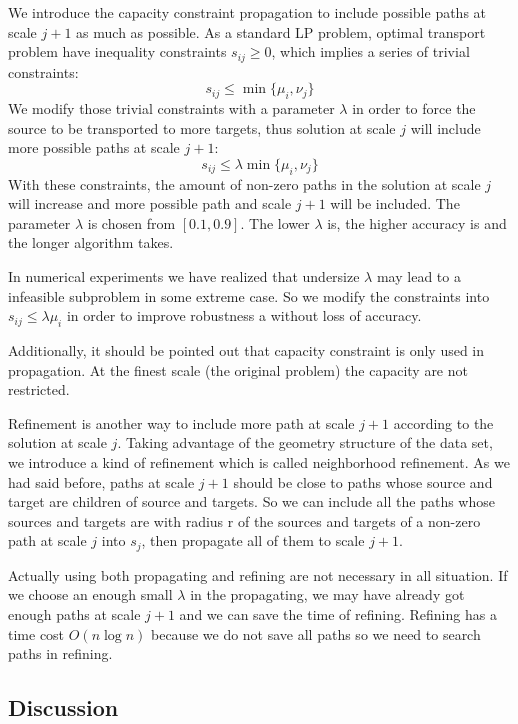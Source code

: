 \documentclass[english]{pkupaper}
\begin{document}
We introduce the capacity constraint propagation to include possible paths at scale $j+1$ as much as possible. As a standard LP problem, optimal transport problem have inequality constraints $s_{ij}\geq 0$, which implies a series of trivial constraints:
\begin{equation}
s_{ij} \leq \min\{\mu_i, \nu_j\}
\end{equation}
We modify those trivial constraints with a parameter $\lambda$ in order to force the source to be transported to more targets, thus solution at scale $j$ will include more possible paths at scale $j+1$:
\begin{equation}
s_{ij}\leq \lambda\min\{\mu_i, \nu_j\}
\end{equation}
With these constraints, the amount of non-zero paths in the solution at scale $j$ will increase and more possible path and scale $j+1$ will be included. The parameter $\lambda$ is chosen from $[0.1, 0.9]$. The lower $\lambda$ is, the higher accuracy is and the longer algorithm takes.

In numerical experiments we have realized that undersize $\lambda$ may lead to a infeasible subproblem in some extreme case. So we modify the constraints into $s_{ij}\leq\lambda\mu_i$ in order to improve robustness a without loss of accuracy.

Additionally, it should be pointed out that capacity constraint is only used in propagation. At the finest scale (the original problem) the capacity are not restricted.

Refinement is another way to include more path at scale $j+1$ according to the solution at scale $j$. Taking advantage of the geometry structure of the data set, we introduce a kind of refinement which is called neighborhood refinement. As we had said before, paths at scale $j+1$ should be close to paths whose source and target are children of source and targets. So we can include all the paths whose sources and targets are with radius r of the sources and targets of a non-zero path at scale $j$ into $s_j$, then propagate all of them to scale $j+1$.

Actually using both propagating and refining are not necessary in all situation. If we choose an enough small $\lambda$ in the propagating, we may have already got enough paths at scale $j+1$ and we can save the time of refining. Refining has a time cost $O(n \log n)$ because we do not save all paths so we need to search paths in refining.

\subsection{Discussion}
\end{document}
